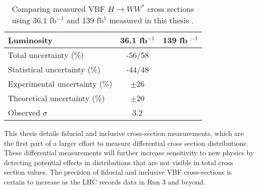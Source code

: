 \begin{table}[!h]
  \begin{center}
    \begin{tabular}{|l|c|c|}
       \hline
        Luminosity & 36.1 fb$^{-1}$    & 139 fb $^{-1}$ \\
      \hline
	Total uncertainty (\%) & -56/58& \\
	Statistical uncertainty (\%) & -44/48 & \\
        Experimental uncertainty (\%) & $\pm$26 & \\
        Theoretical uncertainty (\%) & $\pm$20 & \\
        Observed $\sigma$ & 3.2 & \\
	\hline 
    \end{tabular}
    \caption{Comparing measured VBF $H\rightarrow WW^*$ cross sections using 36.1 fb$^{-1}$ and 139 fb$^{1}$ measured in this thesis \cite{HWW2016}.}
    \label{tab:comparison}
  \end{center}
\end{table}

This thesis details fiducial and inclusive cross-section measurements, which are the first part of a larger effort to measure differential cross section distributions. These differential measurements will further increase sensitivity to new physics by detecting potential effects in distributions that are not visible in total cross section values. The precision of fiducial and inclusive VBF cross-sections is certain to increase as the LHC records data in Run 3 and beyond. 
